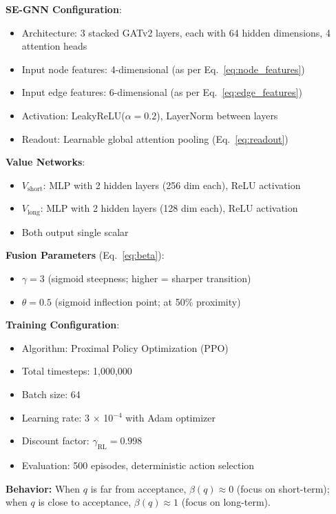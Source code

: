 \documentclass[conference]{IEEEtran}
\begin{document}
\textbf{SE-GNN Configuration}:
\begin{itemize}
    \item Architecture: 3 stacked GATv2 layers, each with 64 hidden dimensions, 4 attention heads
    \item Input node features: 4-dimensional (as per Eq.~\ref{eq:node_features})
    \item Input edge features: 6-dimensional (as per Eq.~\ref{eq:edge_features})
    \item Activation: LeakyReLU($\alpha = 0.2$), LayerNorm between layers
    \item Readout: Learnable global attention pooling (Eq.~\ref{eq:readout})
\end{itemize}

\textbf{Value Networks}:
\begin{itemize}
    \item $V_{\text{short}}$: MLP with 2 hidden layers (256 dim each), ReLU activation
    \item $V_{\text{long}}$: MLP with 2 hidden layers (128 dim each), ReLU activation
    \item Both output single scalar
\end{itemize}

\textbf{Fusion Parameters} (Eq.~\ref{eq:beta}):
\begin{itemize}
    \item $\gamma = 3$ (sigmoid steepness; higher = sharper transition)
    \item $\theta = 0.5$ (sigmoid inflection point; at 50\% proximity)
\end{itemize}

\textbf{Training Configuration}:
\begin{itemize}
    \item Algorithm: Proximal Policy Optimization (PPO)
    \item Total timesteps: 1,000,000
    \item Batch size: 64
    \item Learning rate: 3 × 10$^{-4}$ with Adam optimizer
    \item Discount factor: $\gamma_{\text{RL}} = 0.998$
    \item Evaluation: 500 episodes, deterministic action selection
\end{itemize}

\textbf{Behavior:} When $q$ is far from acceptance, $\beta(q) \approx 0$ (focus on short-term); when $q$ is close to acceptance, $\beta(q) \approx 1$ (focus on long-term).
\end{document}
